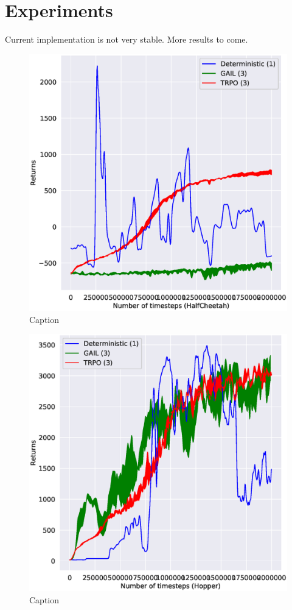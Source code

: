\section{Experiments}
Current implementation is not very stable. More results to come. 

\begin{figure}
    \centering
    \includegraphics[width=.5\linewidth]{figures/HalfCheetah-2000000.eps}
    \caption{Caption}
\end{figure}

\begin{figure}
    \centering
    \includegraphics[width=.5\linewidth]{figures/Hopper-2000000.eps}
    \caption{Caption}
\end{figure}